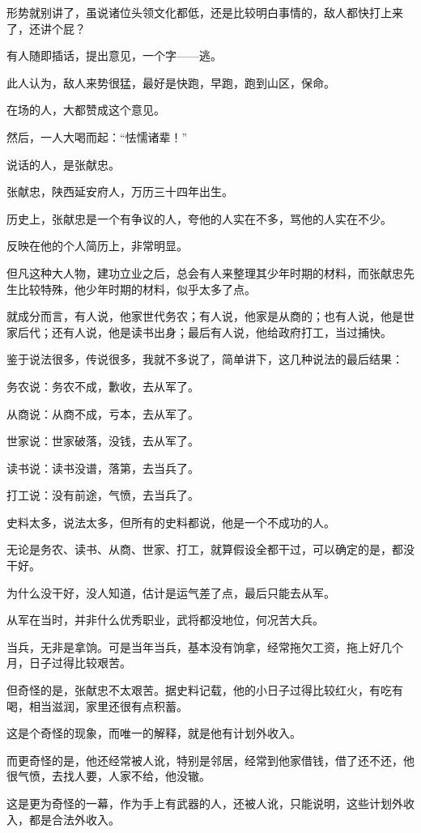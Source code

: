\begin{multicols}{\theparacolNo}
		形势就别讲了，虽说诸位头领文化都低，还是比较明白事情的，敌人都快打上来了，还讲个屁？

		有人随即插话，提出意见，一个字——逃。

		此人认为，敌人来势很猛，最好是快跑，早跑，跑到山区，保命。

		在场的人，大都赞成这个意见。

		然后，一人大喝而起：“怯懦诸辈！”

		说话的人，是张献忠。

		张献忠，陕西延安府人，万历三十四年出生。

		历史上，张献忠是一个有争议的人，夸他的人实在不多，骂他的人实在不少。

		反映在他的个人简历上，非常明显。

		但凡这种大人物，建功立业之后，总会有人来整理其少年时期的材料，而张献忠先生比较特殊，他少年时期的材料，似乎太多了点。

		就成分而言，有人说，他家世代务农；有人说，他家是从商的；也有人说，他是世家后代；还有人说，他是读书出身；最后有人说，他给政府打工，当过捕快。

		鉴于说法很多，传说很多，我就不多说了，简单讲下，这几种说法的最后结果：

		务农说：务农不成，歉收，去从军了。

		从商说：从商不成，亏本，去从军了。

		世家说：世家破落，没钱，去从军了。

		读书说：读书没谱，落第，去当兵了。

		打工说：没有前途，气愤，去当兵了。

		史料太多，说法太多，但所有的史料都说，他是一个不成功的人。

		无论是务农、读书、从商、世家、打工，就算假设全都干过，可以确定的是，都没干好。

		为什么没干好，没人知道，估计是运气差了点，最后只能去从军。

		从军在当时，并非什么优秀职业，武将都没地位，何况苦大兵。

		当兵，无非是拿饷。可是当年当兵，基本没有饷拿，经常拖欠工资，拖上好几个月，日子过得比较艰苦。

		但奇怪的是，张献忠不太艰苦。据史料记载，他的小日子过得比较红火，有吃有喝，相当滋润，家里还很有点积蓄。

		这是个奇怪的现象，而唯一的解释，就是他有计划外收入。

		而更奇怪的是，他还经常被人讹，特别是邻居，经常到他家借钱，借了还不还，他很气愤，去找人要，人家不给，他没辙。

		这是更为奇怪的一幕，作为手上有武器的人，还被人讹，只能说明，这些计划外收入，都是合法外收入。


\end{multicols}
